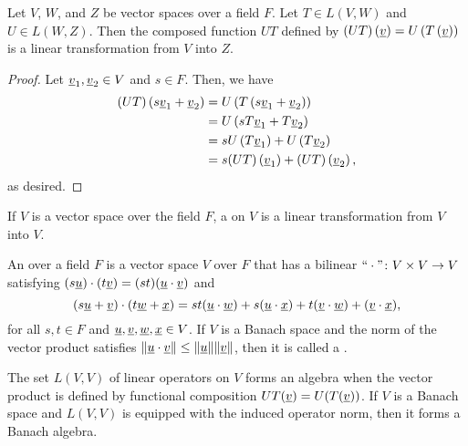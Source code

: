 \begin{theorem}
Let $V$, $W$, and $Z$ be vector spaces over a field $F$.
Let $T \in L(V,W)$ and $U \in L(W,Z)$.
Then the composed function $UT$ defined by $(UT) \left( \underline{v} \right) = U \left( T \left( \underline{v} \right) \right)$ is a linear transformation from $V$ into $Z$.
\end{theorem}
\begin{proof}
Let $\underline{v}_1, \underline{v}_2 \in V$ and $s \in F$.
Then, we have
\begin{equation*}
\begin{split}
(UT) \left( s \underline{v}_1 + \underline{v}_2 \right)
&= U \left( T \left( s \underline{v}_1 + \underline{v}_2 \right) \right) \\
&= U \left( s T \underline{v}_1 + T \underline{v}_2 \right) \\
&= s U \left( T \underline{v}_1 \right) + U \left( T \underline{v}_2 \right) \\
&= s (UT) \left( \underline{v}_1 \right) + (UT) \left( \underline{v}_2 \right) ,
\end{split}
\end{equation*}
as desired.
\end{proof}

\begin{definition}
If $V$ is a vector space over the field $F$, a  on $V$ is a linear transformation from $V$ into $V$.
\end{definition}

\begin{definition}
An  over a field $F$ is a vector space $V$ over $F$ that has a bilinear  $``\cdot" \colon V \times V \to V$ satisfying
$(s\underline{u})\cdot(t\underline{v})=(st)(\underline{u}\cdot \underline{v})$ and
\[ (s\underline{u} + \underline{v})\cdot (t \underline{w} + \underline{x}) = st ( \underline{u}\cdot \underline{w}) + s (\underline{u}\cdot \underline{x}) + t (\underline{v}\cdot \underline{w}) + (\underline{v}\cdot \underline{x}), \]
for all $s,t\in F$ and $\underline{u},\underline{v},\underline{w},\underline{x} \in V$.
If $V$ is a Banach space and the norm of the vector product satisfies $\| \underline{u} \cdot \underline{v} \| \leq \|\underline{u}\| \|\underline{v}\|$, then it is called a .
\end{definition}

\begin{example}
The set $L(V,V)$ of linear operators on $V$ forms an algebra when the vector product is defined by functional composition $UT(\underline{v})=U(T(\underline{v}))$.
If $V$ is a Banach space and $L(V,V)$ is equipped with the induced operator norm, then it forms a Banach algebra.
\end{example}

